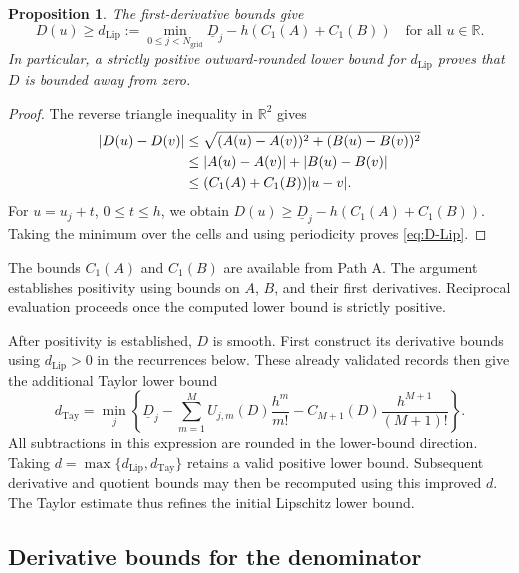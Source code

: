 \documentclass[11pt]{article}
\numberwithin{equation}{section}
\newtheorem{proposition}{Proposition}[section]
\newcommand{\Ngrid}{N_{\mathrm{grid}}}
\begin{document}
\begin{proposition}
The first-derivative bounds give
\begin{equation}
 D(u)\geq d_{\mathrm{Lip}}:=
 \min_{0\leq j<\Ngrid}\underline D_j-h(C_1(A)+C_1(B))
 \quad\text{for all }u\in\mathbb R.
 \label{eq:D-Lip}
\end{equation}
In particular, a strictly positive outward-rounded lower bound for
$d_{\mathrm{Lip}}$ proves that $D$ is bounded away from zero.
\end{proposition}
\begin{proof}
The reverse triangle inequality in $\mathbb R^2$ gives
\begin{align}
 |D(u)-D(v)|
 &\leq\sqrt{(A(u)-A(v))^2+(B(u)-B(v))^2}\notag\\
 &\leq|A(u)-A(v)|+|B(u)-B(v)|\notag\\
 &\leq(C_1(A)+C_1(B))|u-v|.
 \label{eq:D-Lipschitz-proof}
\end{align}
For $u=u_j+t$, $0\leq t\leq h$, we obtain
$D(u)\geq\underline D_j-h(C_1(A)+C_1(B))$. Taking the minimum over the cells
and using periodicity proves \eqref{eq:D-Lip}.
\end{proof}

The bounds $C_1(A)$ and $C_1(B)$ are available from Path A.
The argument establishes positivity using bounds on $A$, $B$, and their
first derivatives. Reciprocal evaluation proceeds once the computed
lower bound is strictly positive.

After positivity is established, $D$ is smooth. First construct its
derivative bounds using $d_{\mathrm{Lip}}>0$ in the recurrences below.
These already validated records then give the additional Taylor lower
bound
\begin{equation}
 d_{\mathrm{Tay}}=
 \min_j\left\{\underline D_j-
 \sum_{m=1}^{M}U_{j,m}(D)\frac{h^m}{m!}
 -C_{M+1}(D)\frac{h^{M+1}}{(M+1)!}\right\}.
 \label{eq:D-Taylor}
\end{equation}
All subtractions in this expression are rounded in the lower-bound
direction. Taking $d=\max\{d_{\mathrm{Lip}},d_{\mathrm{Tay}}\}$ retains a
valid positive lower bound. Subsequent derivative and quotient bounds may
then be recomputed using this improved $d$. The Taylor estimate thus
refines the initial Lipschitz lower bound.

\subsection{Derivative bounds for the denominator}
\label{sec:D-derivatives}
\end{document}
